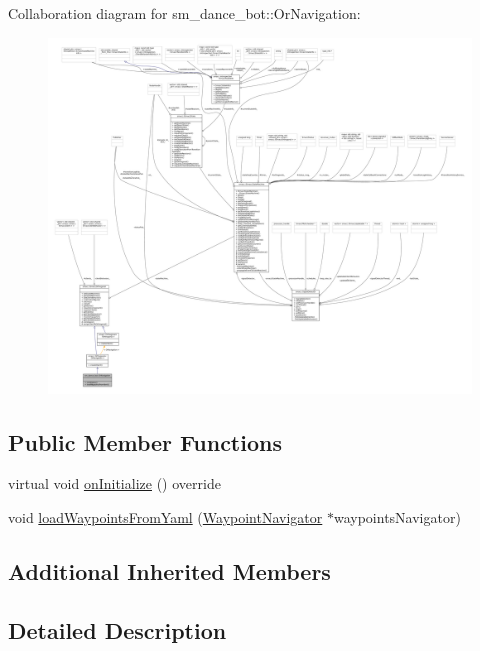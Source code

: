 Collaboration diagram for sm\+\_\+dance\+\_\+bot\+:\+:Or\+Navigation\+:
\nopagebreak
\begin{figure}[H]
\begin{center}
\leavevmode
\includegraphics[width=350pt]{classsm__dance__bot_1_1OrNavigation__coll__graph}
\end{center}
\end{figure}
\subsection*{Public Member Functions}
\begin{DoxyCompactItemize}
\item 
virtual void \hyperlink{classsm__dance__bot_1_1OrNavigation_a9f87c78f5af67024c9eda25097a135ac}{on\+Initialize} () override
\item 
void \hyperlink{classsm__dance__bot_1_1OrNavigation_a1f092ffe3a1b29ae9ea6623aff00ab16}{load\+Waypoints\+From\+Yaml} (\hyperlink{classmove__base__z__client_1_1WaypointNavigator}{Waypoint\+Navigator} $\ast$waypoints\+Navigator)
\end{DoxyCompactItemize}
\subsection*{Additional Inherited Members}


\subsection{Detailed Description}


